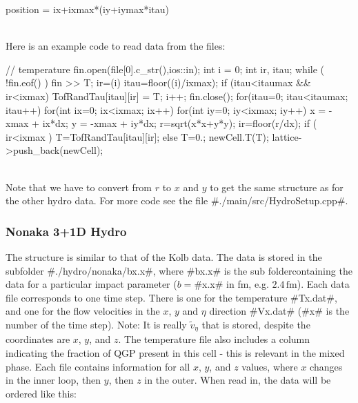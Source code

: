 \begin{boxedverbatim}
 position = ix+ixmax*(iy+iymax*itau) 
\end{boxedverbatim}

~\\

Here is an example code to read data from the files:

\begin{boxedverbatim}
   // temperature
   fin.open(file[0].c_str(),ios::in);
   int i = 0;
   int ir, itau;
   while ( !fin.eof() )
     {
       fin >> T;
       ir=(i)%
       itau=floor((i)/ixmax);
       if (itau<itaumax && ir<ixmax) TofRandTau[itau][ir] = T;
       i++;
     }
   fin.close();
   for(itau=0; itau<itaumax; itau++)
   for(int ix=0; ix<ixmax; ix++)
   for(int iy=0; iy<ixmax; iy++)
      {
        x = -xmax + ix*dx;
        y = -xmax + iy*dx;
        r=sqrt(x*x+y*y);
        ir=floor(r/dx);
        if ( ir<ixmax ) T=TofRandTau[itau][ir];
        else T=0.;
        newCell.T(T);
        lattice->push_back(newCell);
      }
\end{boxedverbatim}

~\\
Note that we have to convert from $r$ to $x$ and $y$ to get the same structure as for the other hydro data. For more code see the file #./main/src/HydroSetup.cpp#.

\newpage
\subsubsection{Nonaka 3+1D Hydro}
\label{nonakadata}
The structure is similar to that of the Kolb data.
The data is stored in the subfolder #./hydro/nonaka/bx.x#, where #bx.x# is the sub foldercontaining the data for a particular impact parameter ($b=$#x.x# in fm, e.g. $2.4\,\mathrm{fm}$).
Each data file corresponds to one time step. There is one for the temperature 
#Tx.dat#, and one for the flow velocities in the $x$, $y$ and $\eta$ direction #Vx.dat# 
(#x# is the number of the time step). Note: It is really $\tilde{v}_\eta$ that is stored, despite the coordinates are $x$, $y$,
and $z$.
The temperature file also includes a column indicating the fraction of QGP present in 
this cell - this is relevant in the mixed phase.
Each file contains information for all $x$, $y$, and $z$ values, where $x$ changes 
in the inner loop, then $y$, then $z$ in the outer. When read in, the data will be 
ordered like this:\\

